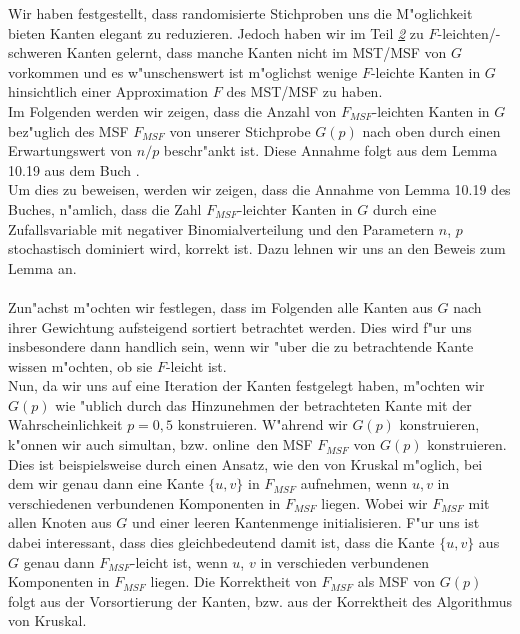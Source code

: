 Wir haben festgestellt, dass randomisierte Stichproben uns die M"oglichkeit 
    bieten Kanten elegant zu reduzieren.
    Jedoch haben wir im Teil \hyperref[sec:fEdg]{\textit{2}} zu $F$-leichten/-schweren Kanten gelernt, dass
    manche Kanten nicht im MST/MSF von $G$ vorkommen und es w"unschenswert
    ist m"oglichst wenige $F$-leichte Kanten in $G$ hinsichtlich einer 
    Approximation $F$ des MST/MSF zu haben.\\
Im Folgenden werden wir zeigen, dass die Anzahl von $F_{MSF}$-leichten Kanten in $G$ 
    bez"uglich des MSF $F_{MSF}$ von unserer Stichprobe $G(p)$ 
    nach oben durch einen Erwartungswert von $n/p$ beschr"ankt ist. 
    Diese Annahme folgt aus dem Lemma 10.19 aus dem Buch \cite{randAlg}.\\
Um dies zu beweisen, werden wir zeigen, dass die Annahme von Lemma 10.19 des
    Buches, n"amlich, dass die Zahl $F_{MSF}$-leichter Kanten in $G$ durch
    eine Zufallsvariable mit negativer Binomialverteilung und den Parametern
    $n$, $p$ stochastisch dominiert wird, korrekt ist.
    Dazu lehnen wir uns an den Beweis zum Lemma an.\\
\\
Zun"achst m"ochten wir festlegen, dass im Folgenden alle Kanten aus $G$ nach 
    ihrer Gewichtung aufsteigend sortiert betrachtet werden.
    Dies wird f"ur uns insbesondere dann handlich sein, wenn wir "uber die zu 
    betrachtende Kante wissen m"ochten, ob sie $F$-leicht ist.\\
Nun, da wir uns auf eine Iteration der Kanten festgelegt haben, m"ochten wir 
    $G(p)$ wie "ublich durch das Hinzunehmen der betrachteten Kante mit
    der Wahrscheinlichkeit $p=0,5$ konstruieren.
    W"ahrend wir $G(p)$ konstruieren, k"onnen wir auch simultan, bzw. 
    \glqq online\grqq\ den MSF $F_{MSF}$ von $G(p)$ konstruieren.
    Dies ist beispielsweise durch einen Ansatz, wie den von Kruskal m"oglich, bei
    dem wir genau dann eine Kante $\{u,v\}$ in $F_{MSF}$ aufnehmen, wenn $u,v$
    in verschiedenen verbundenen Komponenten in $F_{MSF}$ liegen. 
    Wobei wir 
    $F_{MSF}$ mit allen Knoten aus $G$ und einer leeren Kantenmenge 
    initialisieren.
    F"ur uns ist dabei interessant, dass dies gleichbedeutend damit ist, dass die Kante 
    $\{u,v\}$
    aus $G$ genau dann $F_{MSF}$-leicht ist, wenn $u$, $v$ in verschieden 
    verbundenen Komponenten in $F_{MSF}$ liegen.
    Die Korrektheit von $F_{MSF}$ als MSF von $G(p)$ folgt aus der Vorsortierung der Kanten,
    bzw. aus der Korrektheit des Algorithmus von Kruskal.\\
